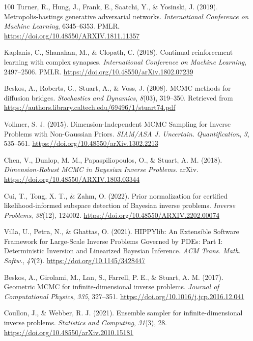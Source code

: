 \documentclass[11pt]{book}
\begin{document}
\begin{thebibliography}{100}
 Turner, R., Hung, J., Frank, E., Saatchi, Y., \& Yosinski, J. (2019).
Metropolis-hastings generative adversarial networks. \emph{International
Conference on Machine Learning}, 6345--6353. PMLR.
\url{https://doi.org/10.48550/ARXIV.1811.11357}

 Kaplanis, C., Shanahan, M., \& Clopath, C. (2018). Continual
reinforcement learning with complex synapses. \emph{International
Conference on Machine Learning}, 2497--2506. PMLR.
\url{https://doi.org/10.48550/arXiv.1802.07239}

 Beskos, A., Roberts, G., Stuart, A., \& Voss, J. (2008). MCMC methods
for diffusion bridges. \emph{Stochastics and Dynamics}, \emph{8}(03),
319--350. Retrieved from
\url{https://authors.library.caltech.edu/69496/1/stuart74.pdf}

 Vollmer, S. J. (2015). Dimension-Independent MCMC Sampling for Inverse
Problems with Non-Gaussian Priors. \emph{SIAM/ASA J. Uncertain.
Quantification}, \emph{3}, 535--561.
\url{https://doi.org/10.48550/arXiv.1302.2213}

 Chen, V., Dunlop, M. M., Papaspiliopoulos, O., \& Stuart, A. M. (2018).
\emph{Dimension-Robust MCMC in Bayesian Inverse Problems}. arXiv.
\url{https://doi.org/10.48550/ARXIV.1803.03344}

 Cui, T., Tong, X. T., \& Zahm, O. (2022). Prior normalization for
certified likelihood-informed subspace detection of Bayesian inverse
problems. \emph{Inverse Problems}, \emph{38}(12), 124002.
\url{https://doi.org/10.48550/ARXIV.2202.00074}

 Villa, U., Petra, N., \& Ghattas, O. (2021). HIPPYlib: An Extensible
Software Framework for Large-Scale Inverse Problems Governed by PDEs:
Part I: Deterministic Inversion and Linearized Bayesian Inference.
\emph{ACM Trans. Math. Softw.}, \emph{47}(2).
\url{https://doi.org/10.1145/3428447}

 Beskos, A., Girolami, M., Lan, S., Farrell, P. E., \& Stuart, A. M.
(2017). Geometric MCMC for infinite-dimensional inverse problems.
\emph{Journal of Computational Physics}, \emph{335}, 327--351.
\url{https://doi.org/10.1016/j.jcp.2016.12.041}

 Coullon, J., \& Webber, R. J. (2021). Ensemble sampler for
infinite-dimensional inverse problems. \emph{Statistics and Computing},
\emph{31}(3), 28. \url{https://doi.org/10.48550/arXiv.2010.15181}


\end{thebibliography}
\end{document}
